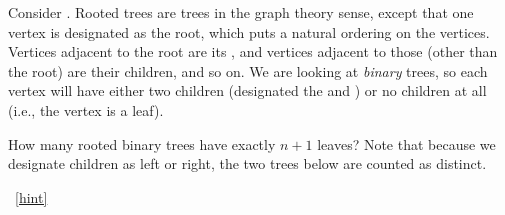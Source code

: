 \documentclass{book}
\begin{document}
\setcounter{project}{177}
\addtocounter{project}{-1}
\begin{activity}[]\label{act-rootedtrees}
\hypertarget{p-1043}{}%
Consider .  Rooted trees are trees in the graph theory sense, except that one vertex is designated as the root, which puts a natural ordering on the vertices.  Vertices adjacent to the root are its , and vertices adjacent to those (other than the root) are their children, and so on.  We are looking at \emph{binary} trees, so each vertex will have either two children (designated the  and ) or no children at all (i.e., the vertex is a leaf).%
\par
\hypertarget{p-1044}{}%
How many rooted binary trees have exactly \(n+1\) leaves?  Note that because we designate children as left or right, the two trees below are counted as distinct.%
\begin{sidebyside}{2}{0.125}{0.125}{0.25}
\begin{sbspanel}{0.25}
\end{sbspanel}
\begin{sbspanel}{0.25}
\end{sbspanel}
\end{sidebyside}
~\hfill{\tiny\hyperlink{a-177}{[hint]}\hypertarget{q-177}{}}\end{activity}
\end{document}
